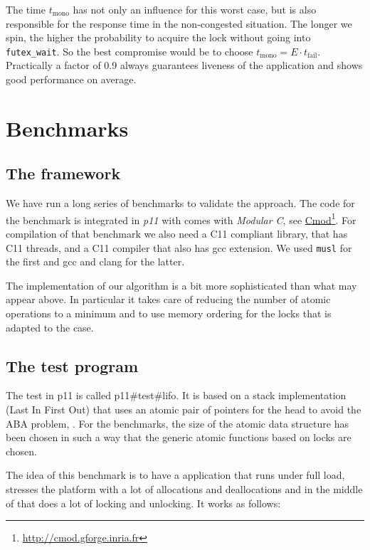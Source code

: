 \documentclass{sig-alternate-05-2015}
\let\oldHref=\href
\def\href#1#2{\oldHref{#1}{#2}\footnote{\url{#1}}}
\begin{document}
The time $t_{\textrm{mono}}$ has not only an influence for this
worst case, but is also responsible for the response time in the
non-congested situation. The longer we spin, the higher the
probability to acquire the lock without going into
\texttt{futex\_wait}. So the best compromise would be to choose
$t_{\textrm{mono}} = E\cdot t_{\textrm{fail}}$. Practically a
factor of 0.9 always guarantees liveness of the application and
shows good performance on average.

\section{Benchmarks}
\label{sec-4}

\subsection{The framework}
\label{sec-4-1}

We have run a long series of benchmarks to validate the
approach. The code for the benchmark is integrated in \emph{p11} with
comes with \emph{Modular C}, see
\href{http://cmod.gforge.inria.fr}{Cmod}. For compilation of that
benchmark we also need a C11 compliant library, that has C11
threads, and a C11 compiler that also has gcc extension. We used
\texttt{musl} for the first and gcc and clang for the latter.

The implementation of our algorithm is a bit more sophisticated
than what may appear above. In particular it takes care of reducing
the number of atomic operations to a minimum and to use memory
ordering for the locks that is adapted to the case.

\subsection{The test program}
\label{sec-4-2}

The test in p11 is called p11\#test\#lifo. It is based on a stack
implementation (Last In First Out) that uses an atomic pair of
pointers for the head to avoid the ABA problem,
\cite{IBM370,michael04:aba}. For the benchmarks, the size of the atomic
data structure has been chosen in such a way that the generic
atomic functions based on locks are chosen.

The idea of this benchmark is to have a application that runs under
full load, stresses the platform with a lot of allocations and
deallocations and in the middle of that does a lot of locking and
unlocking. It works as follows:
\end{document}
